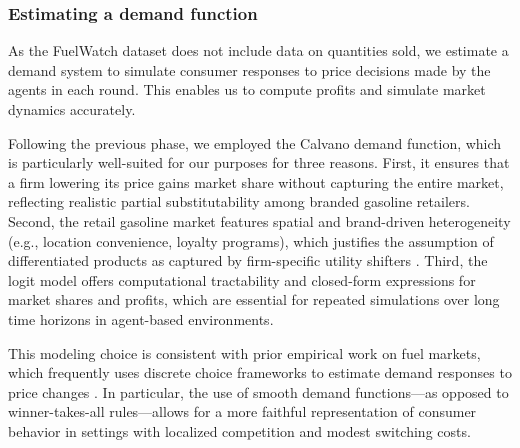 \subsubsection*{Estimating a demand function}

As the FuelWatch dataset does not include data on quantities sold, we estimate a demand system to simulate consumer responses to price decisions made by the agents in each round. This enables us to compute profits and simulate market dynamics accurately.

Following the previous phase, we employed the Calvano demand function, which is particularly well-suited for our purposes for three reasons. First, it ensures that a firm lowering its price gains market share without capturing the entire market, reflecting realistic partial substitutability among branded gasoline retailers. Second, the retail gasoline market features spatial and brand-driven heterogeneity (e.g., location convenience, loyalty programs), which justifies the assumption of differentiated products as captured by firm-specific utility shifters \parencite{hastings_vertical_2004}. Third, the logit model offers computational tractability and closed-form expressions for market shares and profits, which are essential for repeated simulations over long time horizons in agent-based environments.

This modeling choice is consistent with prior empirical work on fuel markets, which frequently uses discrete choice frameworks to estimate demand responses to price changes \parencite{hastings_fungibility_2013, houde_spatial_2012}. In particular, the use of smooth demand functions---as opposed to winner-takes-all rules---allows for a more faithful representation of consumer behavior in settings with localized competition and modest switching costs.




